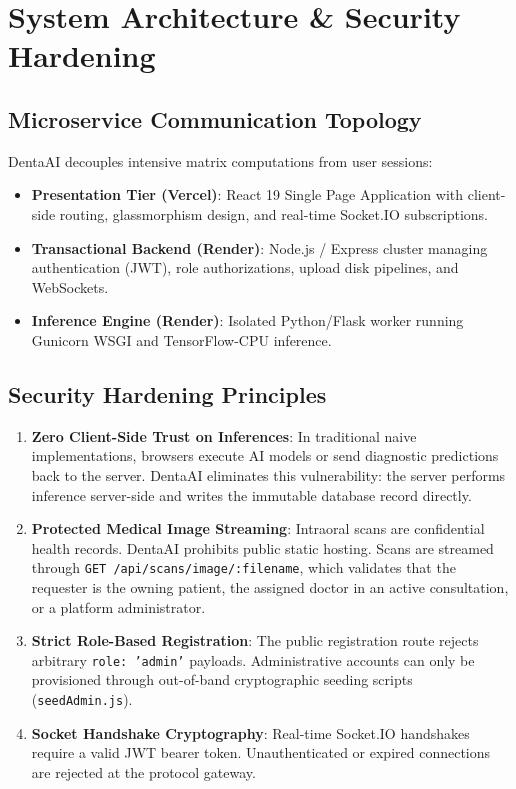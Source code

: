 \documentclass[12pt,a4paper]{report}
\begin{document}
\newpage
\chapter{System Architecture \& Security Hardening}

\section{Microservice Communication Topology}
DentaAI decouples intensive matrix computations from user sessions:
\begin{itemize}
    \item \textbf{Presentation Tier (Vercel)}: React 19 Single Page Application with client-side routing, glassmorphism design, and real-time Socket.IO subscriptions.
    \item \textbf{Transactional Backend (Render)}: Node.js / Express cluster managing authentication (JWT), role authorizations, upload disk pipelines, and WebSockets.
    \item \textbf{Inference Engine (Render)}: Isolated Python/Flask worker running Gunicorn WSGI and TensorFlow-CPU inference.
\end{itemize}

\section{Security Hardening Principles}
\begin{enumerate}
    \item \textbf{Zero Client-Side Trust on Inferences}: In traditional naive implementations, browsers execute AI models or send diagnostic predictions back to the server. DentaAI eliminates this vulnerability: the server performs inference server-side and writes the immutable database record directly.
    \item \textbf{Protected Medical Image Streaming}: Intraoral scans are confidential health records. DentaAI prohibits public static hosting. Scans are streamed through \texttt{GET /api/scans/image/:filename}, which validates that the requester is the owning patient, the assigned doctor in an active consultation, or a platform administrator.
    \item \textbf{Strict Role-Based Registration}: The public registration route rejects arbitrary \texttt{role: 'admin'} payloads. Administrative accounts can only be provisioned through out-of-band cryptographic seeding scripts (\texttt{seedAdmin.js}).
    \item \textbf{Socket Handshake Cryptography}: Real-time Socket.IO handshakes require a valid JWT bearer token. Unauthenticated or expired connections are rejected at the protocol gateway.
\end{enumerate}
\end{document}
